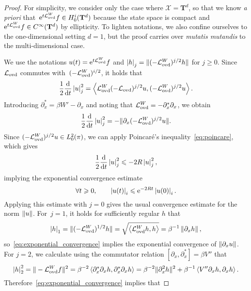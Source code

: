 \documentclass[11pt,a4paper]{article}
\newcommand{\e}{\mathrm{e}}
\newcommand{\commut}[2]{[#1, #2]}
\newcommand{\torus}{\mathbf T}
\theoremstyle{plain}
\numberwithin{equation}{section}
\renewcommand{\leq}{\leqslant}
\renewcommand{\geq}{\geqslant}
\begin{document}
\begin{proof}
    For simplicity, we consider only the case where $\mathcal X = \torus^d$,
    so that we know \emph{a priori} that~$\e^{t \mathcal L_{\rm ovd}^W} f \in H^i_0(\torus^d)$ because
    the state space is compact and $\e^{t \mathcal L_{\rm ovd}^W} f \in C^{\infty}(\torus^d)$ by ellipticity.
    To lighten notations,
    we also confine ourselves to the one-dimensional setting $d = 1$,
    but the proof carries over \emph{mutatis mutandis} to the multi-dimensional case.

    We use the notations $u(t) = \e^{t \mathcal L_{\rm ovd}^W} f$ and
     $\seminorm{h}_j = \norm*{(- \mathcal L_{\rm ovd}^W)^{j/2} h}$ for $j \geq 0$.
    Since $\mathcal L_{\rm ovd}$ commutes with~$(-\mathcal L_{\rm ovd}^W)^{i/2}$,
    it holds that
    \[
        \frac{1}{2} \derivative*{1}{t} \seminorm{u}_j^2 = \ip{\mathcal L_{\rm ovd}^W (-\mathcal L_{\rm ovd})^{j/2} u}{(- \mathcal L_{\rm ovd}^W)^{j/2} u}.
    \]
    Introducing $\partial_x^* = \beta W' - \partial_x$
    and noting that $\mathcal L_{\rm ovd}^W = - \partial_x^* \partial_x$,
    we obtain
    \[
        \frac{1}{2} \derivative*{1}{t} \seminorm{u}_j^2 = - \norm*{\partial_x (-\mathcal L_{\rm ovd}^W)^{j/2} u}.
    \]
    Since $(-\mathcal L_{\rm ovd}^W)^{j/2} u \in L^2_0(\pi)$,
    we can apply Poincar\'e's inequality~\eqref{eq:poincare},
    which gives
    \[
        \frac{1}{2} \derivative*{1}{t} \seminorm{u}_j^2 \leq - 2R \seminorm{u}_j^2,
    \]
    implying the exponential convergence estimate
    \begin{equation}
        \label{eq:exponential_convergence}
        \forall t \geq 0, \qquad
        \seminorm{u(t)}_i \leq \e^{- 2 R t} \seminorm{u(0)}_i.
    \end{equation}
    Applying this estimate with $j = 0$ gives the usual convergence estimate for the norm $\norm{u}$.
    For~$j = 1$, it holds for sufficiently regular $h$ that
    \[
        \seminorm{h}_1 = \norm*{(- \mathcal L_{\rm ovd}^W)^{1/2} h} = \sqrt{\ip{\mathcal L_{\rm ovd}^W h}{h}} = \beta^{-1} \norm{\partial_x h},
    \]
    so~\eqref{eq:exponential_convergence} implies the exponential convergence of $\norm{\partial_x u}$.
    For $j = 2$, we calculate using the commutator relation $\commut{\partial_x}{\partial_x^*} = \beta V''$ that
    \[
        \seminorm{h}_2^2 = \norm*{- \mathcal L_{\rm ovd}^Wf}^2
        = \beta^{-2} \ip{\partial_x^* \partial_x h}{\partial_x^* \partial_x h}
        = \beta^{-2} \norm*{\partial_x^2 h}^2 + \beta^{-1} \ip{V'' \partial_x h}{\partial_x h}.
    \]
    Therefore~\eqref{eq:exponential_convergence} implies that

\end{proof}
\end{document}
